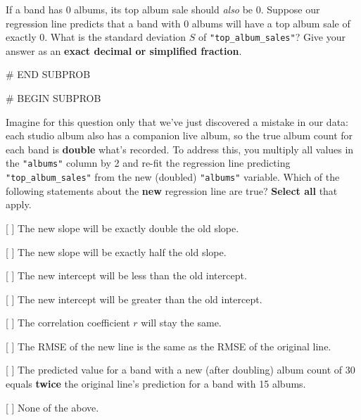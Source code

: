 \documentclass[twoside,12pt]{article}
\begin{document}
{  
If a band has $0$ albums, its top album sale should \textit{also} be $0$. Suppose our regression line predicts that a band with $0$ albums will have a top album sale of exactly $0$. What is the standard deviation $S$ of \texttt{"top\_album\_sales"}? Give your answer as an \textbf{exact decimal or simplified fraction}.

\begin{center}
\end{center}



# END SUBPROB

\bigskip

# BEGIN SUBPROB

  
Imagine for this question only that we've just discovered a mistake in our data: each studio album also has a companion live album, so the true album count for each band is \textbf{double} what's recorded. To address this, you multiply all values in the \texttt{"albums"} column by 2 and re-fit the regression line predicting \texttt{"top\_album\_sales"} from the new (doubled) \texttt{"albums"} variable. Which of the following statements about the \textbf{new} regression line are true? \textbf{Select all} that apply.

\vspace{0.5em}

[ ] The new slope will be exactly double the old slope.

\smallskip

[ ] The new slope will be exactly half the old slope.

\smallskip

[ ] The new intercept will be less than the old intercept.


\smallskip

[ ] The new intercept will be greater than the old intercept.

\smallskip

[ ] The correlation coefficient $r$ will stay the same.

\smallskip

[ ] The RMSE of the new line is the same as the RMSE of the original line.

\smallskip

[ ] The predicted value for a band with a new (after doubling) album count of 30 \gap equals \textbf{twice} the original line's prediction for a band with 15 albums.


\smallskip

[ ] None of the above.



}
\end{document}
